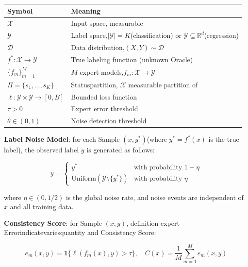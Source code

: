 \documentclass[
  12pt,
]{article}
\begin{document}
\begin{longtable}[]{@{}
  >{\raggedright\arraybackslash}p{}
  >{\raggedright\arraybackslash}p{}@{}}
\toprule\noalign{}
\begin{minipage}[b]{\linewidth}\raggedright
Symbol
\end{minipage} & \begin{minipage}[b]{\linewidth}\raggedright
Meaning
\end{minipage} \\
\midrule\noalign{}
\endhead
\bottomrule\noalign{}
\endlastfoot
\(\mathcal{X}\) & Input space, measurable \\
\(\mathcal{Y}\) & Label space,\(|\mathcal{Y}| = K\)(classification) or
\(\mathcal{Y} \subseteq \mathbb{R}^d\)(regression) \\
\(\mathcal{D}\) & Data distribution,\((X, Y) \sim \mathcal{D}\) \\
\(f^* : \mathcal{X} \to \mathcal{Y}\) & True labeling function (unknown Oracle) \\
\(\{f_m\}_{m=1}^M\) & \(M\)
expert models,\(f_m : \mathcal{X} \to \mathcal{Y}\) \\
\(\Pi = \{s_1, \dots, s_K\}\) & Statuspartition, \(\mathcal{X}\) measurable partition of \\
\(\ell : \mathcal{Y} \times \mathcal{Y} \to [0, B]\) & Bounded loss function \\
\(\tau > 0\) & Expert error threshold \\
\(\theta \in (0, 1)\) & Noise detection threshold \\
\end{longtable}

\textbf{Label Noise Model}: for each Sample \((x, y^*)\)(where \(y^* = f^*(x)\)
is the true label), the observed label \(y\) is generated as follows:

\[y = \begin{cases}
y^* & \text{with probability } 1 - \eta \\
\text{Uniform}(\mathcal{Y} \setminus \{y^*\}) & \text{with probability } \eta
\end{cases}\]

where \(\eta \in (0, 1/2)\) is the global noise rate, and noise events are independent of \(x\)
and all training data.

\textbf{Consistency Score}: for Sample
\((x, y)\), definition expert Errorindicatevariesquantity and Consistency Score: 

\[e_m(x, y) = \mathbf{1}\{\ell(f_m(x), y) > \tau\}, \quad
C(x) = \frac{1}{M} \sum_{m=1}^M e_m(x, y)\]
\end{document}

